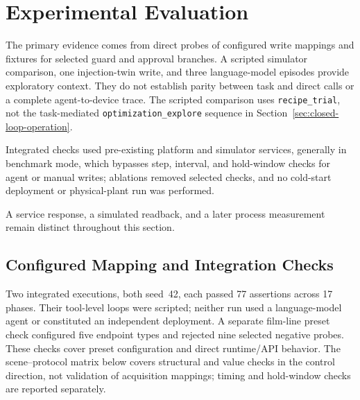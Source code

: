\section{Experimental Evaluation}
\label{sec:eval}
The primary evidence comes from direct probes of configured write mappings and fixtures for selected guard and approval branches. A scripted simulator comparison, one injection-twin write, and three language-model episodes provide exploratory context. They do not establish parity between task and direct calls or a complete agent-to-device trace. The scripted comparison uses \texttt{recipe\_trial}, not the task-mediated \texttt{optimization\_explore} sequence in Section~\ref{sec:closed-loop-operation}.

Integrated checks used pre-existing platform and simulator services, generally in benchmark mode, which bypasses step, interval, and hold-window checks for agent or manual writes; ablations removed selected checks, and no cold-start deployment or physical-plant run was performed.

A service response, a simulated readback, and a later process measurement remain distinct throughout this section.

\subsection{Configured Mapping and Integration Checks}
\label{sec:eval-mapping}
Two integrated executions, both seed~42, each passed 77 assertions across 17 phases. Their tool-level loops were scripted; neither run used a language-model agent or constituted an independent deployment. A separate film-line preset check configured five endpoint types and rejected nine selected negative probes. These checks cover preset configuration and direct runtime/API behavior. The scene--protocol matrix below covers structural and value checks in the control direction, not validation of acquisition mappings; timing and hold-window checks are reported separately.

